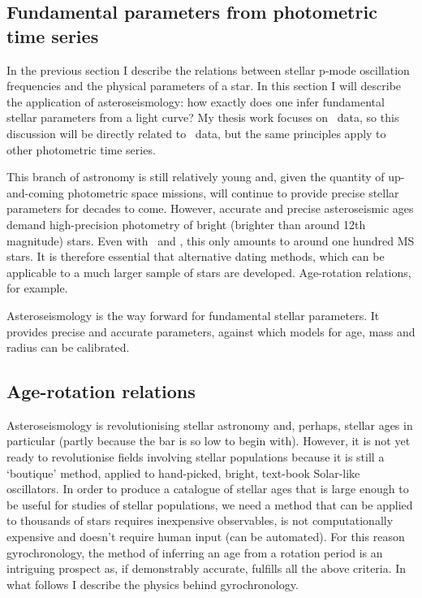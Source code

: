 \subsection{Fundamental parameters from photometric time series}

In the previous section I describe the relations between stellar p-mode
oscillation frequencies and the physical parameters of a star.
In this section I will describe the application of asteroseismology: how
exactly does one infer fundamental stellar parameters from a light curve?
My thesis work focuses on \kepler\ data, so this discussion will be directly
related to \kepler\ data, but the same principles apply to other photometric
time series.

This branch of astronomy is still relatively young and, given the quantity of
up-and-coming photometric space missions, will continue to provide precise
stellar parameters for decades to come.
However, accurate and precise asteroseismic ages demand high-precision
photometry of bright (brighter than around 12th magnitude) stars.
Even with \kepler\ and \corot, this only amounts to around one hundred MS
stars.
It is therefore essential that alternative dating methods, which can be
applicable to a much larger sample of stars are developed.
Age-rotation relations, for example.

Asteroseismology is the way forward for fundamental stellar parameters.
It provides precise and accurate parameters, against which models for age,
mass and radius can be calibrated.

\subsection{Age-rotation relations}

Asteroseismology is revolutionising stellar astronomy and, perhaps, stellar
ages in particular (partly because the bar is so low to begin with).
However, it is not yet ready to  revolutionise fields involving stellar
populations because it is still a `boutique' method, applied to hand-picked,
bright, text-book Solar-like oscillators.
In order to produce a catalogue of stellar ages that is large enough to be
useful for studies of stellar populations, we need a method that can be
applied to thousands of stars \ie requires inexpensive observables, is not
computationally expensive and doesn't require human input (can be automated).
For this reason gyrochronology, the method of inferring an age from a rotation
period is an intriguing prospect as, if demonstrably accurate, fulfills all
the above criteria.
In what follows I describe the physics behind gyrochronology.


